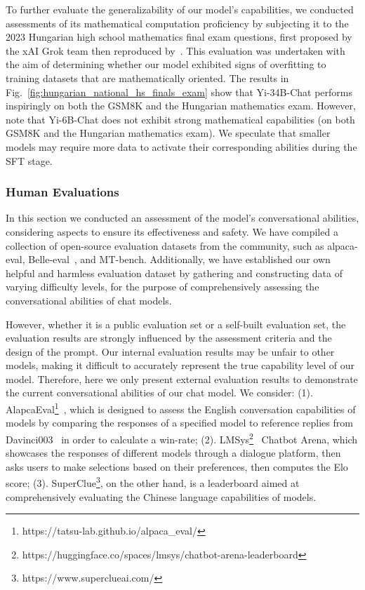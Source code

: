 To further evaluate the generalizability of our model's capabilities, we conducted assessments of its mathematical computation proficiency by subjecting it to the 2023 Hungarian high school mathematics final exam questions, first proposed by the xAI Grok team then reproduced by~\citet{testing_language_models_on_a_held_out_high_school_national_finals_exam}. This evaluation was undertaken with the aim of determining whether our model exhibited signs of overfitting to training datasets that are mathematically oriented.
The results in Fig.~\ref{fig:hungarian_national_hs_finals_exam} show that Yi-34B-Chat performs inspiringly on both the GSM8K and the Hungarian mathematics exam. However, note that Yi-6B-Chat does not exhibit strong mathematical capabilities (on both GSM8K and the Hungarian mathematics exam). We speculate that smaller models may require more data to activate their corresponding abilities during the SFT stage.








\subsubsection{Human Evaluations}


In this section we conducted an assessment of the model's conversational abilities, considering aspects to ensure its effectiveness and safety. We have compiled a collection of open-source evaluation datasets from the community, such as alpaca-eval\cite{dubois2023alpacafarm}, Belle-eval~\citep{belle2023exploring}, and MT-bench\cite{zheng2023judging}. Additionally, we have established our own helpful and harmless evaluation dataset by gathering and constructing data of varying difficulty levels, for the purpose of comprehensively assessing the conversational abilities of chat models.

However, whether it is a public evaluation set or a self-built evaluation set, the evaluation results are strongly influenced by the assessment criteria and the design of the prompt. Our internal evaluation results may be unfair to other models, making it difficult to accurately represent the true capability level of our model.
Therefore, here we only present external evaluation results to demonstrate the current conversational abilities of our chat model.
We consider: 
(1). AlapcaEval\footnote{https://tatsu-lab.github.io/alpaca\_eval/}~\citep{alpaca_eval}, which is designed to assess the English conversation capabilities of models by comparing the responses of a specified model to reference replies from Davinci003~\citep{dubois2023alpacafarm} in order to calculate a win-rate;
(2). LMSys\footnote{https://huggingface.co/spaces/lmsys/chatbot-arena-leaderboard}~\citep{zheng2023judging} Chatbot Arena, which showcases the responses of different models through a dialogue platform, then asks users to make selections based on their preferences, then computes the Elo score; (3). SuperClue\footnote{https://www.superclueai.com/}, on the other hand, is a leaderboard aimed at comprehensively evaluating the Chinese language capabilities of models.


